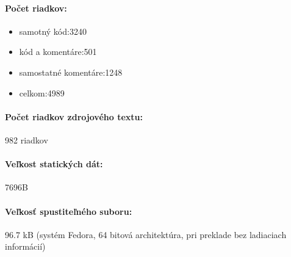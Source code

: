 \documentclass[12pt,a4paper,titlepage,final]{article}
\begin{document}
\paragraph{Počet riadkov:}
\begin{itemize}
\item	  samotný kód:3240
\item	  kód a komentáre:501
\item	  samostatné komentáre:1248
\item	  celkom:4989
\end{itemize}
\paragraph{Počet riadkov zdrojového textu:} 982  riadkov
\paragraph{Veľkost statických dát:} 7696B
\paragraph{Veľkosť spustiteľného suboru:} 96.7 kB (systém Fedora, 64 bitová
architektúra, pri preklade bez ladiaciach informácií)

\newpage 
\end{document}
